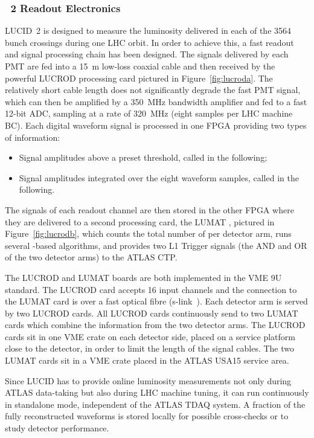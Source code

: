 \documentclass[cernpreprint, atlasdraft=false, UKenglish,british,orcidlogo, texmf, orcidlogo]{atlasdoc}
\begin{document}
 
\subsubsection{~2 Readout Electronics}
\gls{LUCID}~2 is designed to measure the luminosity delivered in each of the \num{3564} bunch crossings during one \gls{LHC} orbit.
In order to achieve this, a fast \analog readout and signal processing chain has been designed.
The signals delivered by each \gls{PMT} are fed into a \SI{15}{\m} low-loss coaxial cable and then received by the powerful \gls{LUCROD} processing card
pictured in Figure~\ref{fig:lucroda}. The relatively short cable length does not significantly degrade the fast \gls{PMT} signal,
which can then be amplified by a \SI{350}{\MHz} bandwidth amplifier and fed to a fast 12-bit ADC, sampling at a rate of \SI{320}{\MHz} (eight samples
per \gls{LHC} machine \gls{BC}). Each digital waveform signal is processed in one FPGA providing two types of information:
\begin{itemize}
\item Signal amplitudes above a preset threshold, called {\textit \HITs} in the following;
\item Signal amplitudes integrated over the eight waveform samples, called {\textit \CHARGE} in the following.
\end{itemize}
The \HIT signals of each readout channel are then stored in the other \gls{FPGA} where they are delivered to a second processing card, the \gls{LUMAT}
, pictured in Figure~\ref{fig:lucrodb}, which counts the total number of \HITs per detector arm, runs several \HIT-based algorithms, and provides two \gls{L1} Trigger signals (the AND and OR of the two detector arms) to the ATLAS \gls{CTP}.
 
 
The \gls{LUCROD} and \gls{LUMAT} boards are both implemented in the \gls{VME} 9U standard. The \gls{LUCROD} card accepts \num{16} \analog input channels and the connection to the \gls{LUMAT} card is over a fast optical fibre (\gls{s-link}~\cite{slink}). Each detector arm is served by two \gls{LUCROD} cards. All \gls{LUCROD} cards continuously send \HITs to two \gls{LUMAT} cards which combine the information from the two detector arms. The \gls{LUCROD} cards sit in one \gls{VME} crate on each detector side, placed on a service platform close to the detector, in order to limit the length of the signal cables. The two \gls{LUMAT} cards sit in a \gls{VME} crate placed in the ATLAS \gls{USA15} service area.
 
Since \gls{LUCID} has to provide online luminosity measurements not only during ATLAS data-taking but also during \gls{LHC} machine tuning, it can run continuously in standalone mode, independent of the ATLAS \gls{TDAQ} system.
A fraction of the fully reconstructed waveforms is stored locally for possible cross-checks or to study detector performance.
 
\end{document}
